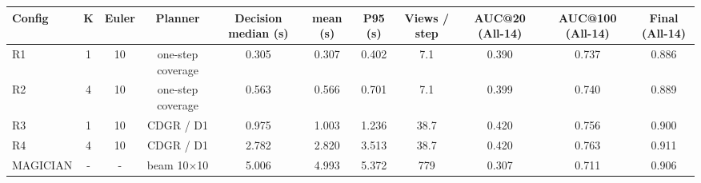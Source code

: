 \begin{tabular}{@{}lcccccccccc@{}}
\toprule
Config & K & Euler & Planner & Decision median (s) & mean (s) & P95 (s) & Views / step & AUC@20 (All-14) & AUC@100 (All-14) & Final (All-14) \\
\midrule
R1 & 1 & 10 & one-step coverage & 0.305 & 0.307 & 0.402 & 7.1 & 0.390 & 0.737 & 0.886 \\
R2 & 4 & 10 & one-step coverage & 0.563 & 0.566 & 0.701 & 7.1 & 0.399 & 0.740 & 0.889 \\
R3 & 1 & 10 & CDGR / D1 & 0.975 & 1.003 & 1.236 & 38.7 & 0.420 & 0.756 & 0.900 \\
R4 & 4 & 10 & CDGR / D1 & 2.782 & 2.820 & 3.513 & 38.7 & 0.420 & 0.763 & 0.911 \\
MAGICIAN & - & - & beam 10$\times$10 & 5.006 & 4.993 & 5.372 & 779 & 0.307 & 0.711 & 0.906 \\
\bottomrule
\end{tabular}
